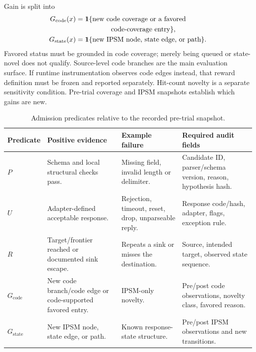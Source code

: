 \documentclass[final,5p,times,number]{elsarticle}
\newcommand{\gcode}{G_{\mathrm{code}}}
\newcommand{\gstate}{G_{\mathrm{state}}}
\begin{document}
Gain is split into
\begin{align}
\gcode(x)&=\mathbf{1}\{\text{new code coverage or a favored}\nonumber\\
&\hspace{18mm}\text{code-coverage entry}\},\label{eq:gcode}\\
\gstate(x)&=\mathbf{1}\{\text{new IPSM node, state edge, or path}\}.\label{eq:gstate}
\end{align}
Favored status must be grounded in code coverage; merely being queued or state-novel does not qualify. Source-level code branches are the main evaluation surface. If runtime instrumentation observes code edges instead, that reward definition must be frozen and reported separately. Hit-count novelty is a separate sensitivity condition. Pre-trial coverage and IPSM snapshots establish which gains are new.

\begin{table}[!tbp]
\centering\small
\caption{Admission predicates relative to the recorded pre-trial snapshot.}
\label{tab:predicates}
\begin{tabularx}{\textwidth}{l Y Y Y}
\toprule
Predicate & Positive evidence & Example failure & Required audit fields \\
\midrule
$P$ & Schema and local structural checks pass. & Missing field, invalid length or delimiter. & Candidate ID, parser/schema version, reason, hypothesis hash. \\
$U$ & Adapter-defined acceptable response. & Rejection, timeout, reset, drop, unparseable reply. & Response code/hash, adapter, flags, exception rule. \\
$R$ & Target/frontier reached or documented sink escape. & Repeats a sink or misses the destination. & Source, intended target, observed state sequence. \\
$\gcode$ & New code branch/code edge or code-supported favored entry. & IPSM-only novelty. & Pre/post code observations, novelty class, favored reason. \\
$\gstate$ & New IPSM node, state edge, or path. & Known response-state structure. & Pre/post IPSM observations and new transitions. \\
\bottomrule
\end{tabularx}
\end{table}
\end{document}
